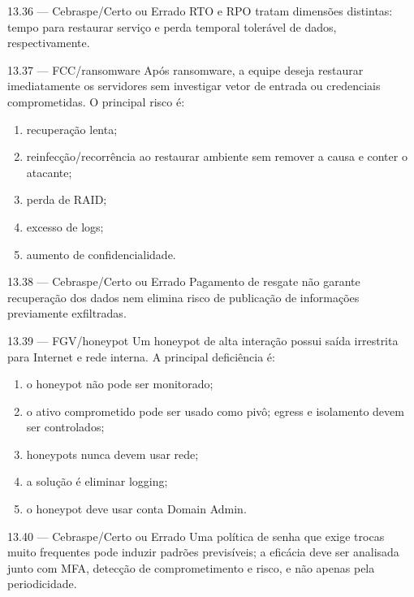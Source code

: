 \begin{questao}{ 13.36 — Cebraspe/Certo ou Errado}
RTO e RPO tratam dimensões distintas: tempo para restaurar serviço e perda temporal tolerável de dados, respectivamente.
\end{questao}

\begin{questao}{ 13.37 — FCC/ransomware}
Após ransomware, a equipe deseja restaurar imediatamente os servidores sem investigar vetor de entrada ou credenciais comprometidas. O principal risco é:
\begin{enumerate}[label=\Alph*)]
\item recuperação lenta;
\item reinfecção/recorrência ao restaurar ambiente sem remover a causa e conter o atacante;
\item perda de RAID;
\item excesso de logs;
\item aumento de confidencialidade.
\end{enumerate}
\end{questao}

\begin{questao}{ 13.38 — Cebraspe/Certo ou Errado}
Pagamento de resgate não garante recuperação dos dados nem elimina risco de publicação de informações previamente exfiltradas.
\end{questao}

\begin{questao}{ 13.39 — FGV/honeypot}
Um honeypot de alta interação possui saída irrestrita para Internet e rede interna. A principal deficiência é:
\begin{enumerate}[label=\Alph*)]
\item o honeypot não pode ser monitorado;
\item o ativo comprometido pode ser usado como pivô; egress e isolamento devem ser controlados;
\item honeypots nunca devem usar rede;
\item a solução é eliminar logging;
\item o honeypot deve usar conta Domain Admin.
\end{enumerate}
\end{questao}

\begin{questao}{ 13.40 — Cebraspe/Certo ou Errado}
Uma política de senha que exige trocas muito frequentes pode induzir padrões previsíveis; a eficácia deve ser analisada junto com MFA, detecção de comprometimento e risco, e não apenas pela periodicidade.
\end{questao}


